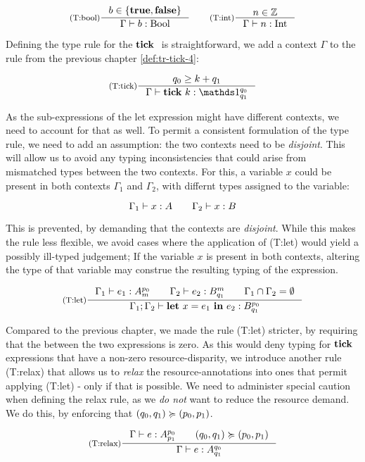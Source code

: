 \[
   \inference[(T:bool)]
   {b \in \{\true, \false\}}
   {\typing{\Gamma}{b}{\text{\bool}}}%
   \qquad
   \inference[(T:int)]
   {n \in \mathbb{Z}}
   {\typing{\Gamma}{n}{\text{\typeint}}}
\]

Defining the type rule for the \(\mathbf{tick}~\) is straightforward, we add a context \(\Gamma\) to the rule from the previous chapter \cref{def:tr-tick-4}:

\[
   \inference[(T:tick)]
   {q_0 \geq k + q_1}
   {\typing{\Gamma}{\tick{k}}{\ratype{\unit}{q_0}{q_1}}}
\]

As the sub-expressions of the let expression might have different contexts, we need to account for that as well. To permit a consistent formulation of the type rule, we need to add an assumption: the two contexts need to be \emph{disjoint}. This will allow us to avoid any typing inconsistencies that could arise from mismatched types between the two contexts. 
For this, a variable \(x\) could be present in both contexts \(\Gamma_1\) and \(\Gamma_2\), with differnt types assigned to the variable:

\[
   \Gamma_1 \vdash x : A \qquad \Gamma_2 \vdash x : B
\]

This is prevented, by demanding that the contexts are \emph{disjoint}. While this makes the rule less flexible, we avoid cases where the application of (T:let) would yield a possibly ill-typed judgement; If the variable \(x\) is present in both contexts, altering the type of that variable may construe the resulting typing of the expression.

\[
   \inference[(T:let)]
   {\typing{\Gamma_1}{e_1}{\ratype{A}{p_0}{m}} \qquad \typing{\Gamma_2}{e_2}{\ratype{B}{m}{q_1}} \qquad \Gamma_1 \cap \Gamma_2 = \emptyset}
   {\typing{\Gamma_1; \Gamma_2}{\letexp{x}{e_1}{e_2}}{\ratype{B}{p_0}{q_1}}}
\]

Compared to the previous chapter, we made the rule (T:let) stricter, by requiring that the  between the two expressions is zero. As this would deny typing for \(\mathbf{tick}~\) expressions that have a non-zero resource-disparity, we introduce another rule (T:relax) that allows us to \emph{relax} the resource-annotations into ones that permit applying (T:let) - only if that is possible. 
We need to administer special caution when defining the relax rule, as we \emph{do not} want to reduce the resource demand. We do this, by enforcing that \((q_0, q_1) \succcurlyeq (p_0, p_1)\).

\[
   \inference[(T:relax)]
   {\typing{\Gamma}{e}{\ratype{A}{p_0}{p_1}} \qquad (q_0, q_1) \relaxation (p_0, p_1)}
   {\typing{\Gamma}{e}{\ratype{A}{q_0}{q_1}}}
\]



